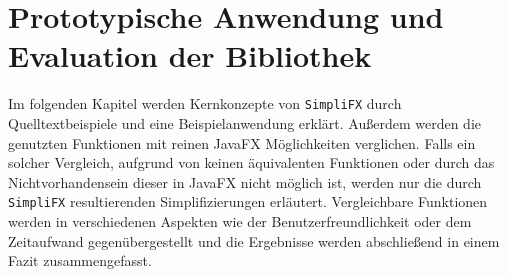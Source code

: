 \chapter{Prototypische Anwendung und Evaluation der Bibliothek}
\label{evaluation}
Im folgenden Kapitel werden Kernkonzepte von \texttt{SimpliFX} durch Quelltextbeispiele und eine Beispielanwendung erklärt. Außerdem werden die genutzten Funktionen mit reinen JavaFX Möglichkeiten verglichen. Falls ein solcher Vergleich, aufgrund von keinen äquivalenten Funktionen oder durch das Nichtvorhandensein dieser in JavaFX nicht möglich ist, werden nur die durch \texttt{SimpliFX} resultierenden Simplifizierungen erläutert. Vergleichbare Funktionen werden in verschiedenen Aspekten wie der Benutzerfreundlichkeit oder dem Zeitaufwand gegenübergestellt und die Ergebnisse werden abschließend in einem Fazit zusammengefasst.
